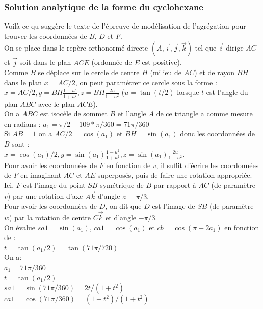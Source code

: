 \documentclass[a4paper,11pt]{book}
\begin{document}
 \subsubsection{Solution analytique de la forme du cyclohexane}
Voil\`a ce qu sugg\`ere le texte de l'\'epreuve de mod\'elisation de 
l'agr\'egation pour trouver les coordonn\'ees de $B$, $D$ et $F$.\\
On se place dans le rep\`ere orthonorm\'e directe 
$(A,\overrightarrow{i},\overrightarrow{j},\overrightarrow{k})$ tel que
$\overrightarrow{i}$ dirige $AC$ et $\overrightarrow{j}$ soit dans le plan
$ACE$ (ordonn\'ee de $E$ est positive).\\
Comme $B$ se d\'eplace sur le cercle de centre $H$ (milieu de $AC$) et de rayon
 $BH$ dans le plan $x=AC/2$, on peut param\'etrer ce cercle sous la forme :\\
$\displaystyle x=AC/2,y=BH\frac{1-u^2}{1+u^2},z=BH\frac{2u}{1+u^2}$ 
($u=\tan(t/2)$ lorsque $t$ est l'angle du plan $ABC$ avec le plan $ACE$).\\
On a $ABC$ est isoc\`ele de sommet $B$ et l'angle $A$ de ce triangle a comme 
mesure en radians : $a_1=\pi/2-109*\pi/360=71\pi/360$\\
Si $AB=1$ on a $AC/2=\cos(a_1)$ et $BH=\sin(a_1)$ donc les coordonn\'ees de $B$ 
sont : \\
$\displaystyle x=\cos(a_1)/2,y=\sin(a_1)\frac{1-u^2}{1+u^2},z=\sin(a_1)\frac{2u}{1+u^2}$.\\
Pour  avoir les coordonn\'ees de $F$ en fonction de $v$, il suffit d'\'ecrire 
les coordonn\'ees de $F$ en imaginant $AC$ et $AE$ superpos\'es, puis de faire 
une rotation appropri\'ee. \\
Ici, $F$ est l'image du point $SB$ sym\'etrique de $B$ 
par rapport \`a $AC$ (de param\`etre $v$) par une rotation d'axe 
$A\overrightarrow{k}$ d'angle $a=\pi/3$.\\
Pour  avoir les coordonn\`ees de $D$, on dit que $D$ est l'image de $SB$ (de 
param\`etre $w$) par la rotation de centre $C\overrightarrow{k}$ et d'angle 
$-\pi/3$.\\
On \'evalue $sa1=\sin(a_1)$, $ca1=\cos(a_1)$ et $cb=\cos(\pi-2a_1)$
en fonction de :\\
$t=\tan(a_1/2)=\tan(71\pi/720)$\\
On a:\\
$a_1=71\pi/360$\\
$t=\tan(a_1/2)$\\
$sa1=\sin(71\pi/360)=2t/(1+t^2)$\\
$ca1=\cos(71\pi/360)=(1-t^2)/(1+t^2)$\\
\end{document}
